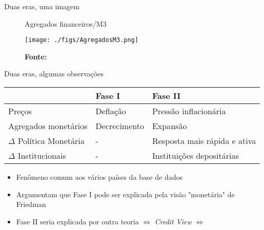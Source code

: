 \documentclass[presentation]{beamer}
\begin{document}
\begin{frame}[label={sec:org25dfaf0}]{Duas eras, uma imagem}
\begin{figure}[htb]
\centering
\caption{Agregados financeiros/M3} 
\texttt{[image: ./figs/AgregadosM3.png]}
\label{fig:agregados}
\caption*{\textbf{Fonte:} \textcite[p.~ 1035]{schularickCreditBoomsGone2012}}
\end{figure}
\end{frame}

\begin{frame}[label={sec:org19044e6}]{Duas eras, algumas observações}
\begin{center}
\begin{tabular}{lll}
\hline
 & Fase I & Fase II\\
\hline
Preços & Deflação & Pressão inflacionária\\
Agregados monetários & Decrecimento & Expansão\\
\(\Delta\) Política Monetária & - & Resposta mais rápida e ativa\\
\(\Delta\) Institucionais & - & Instituições depositárias\\
\hline
\end{tabular}
\end{center}

\begin{itemize}
\item Fenômeno comum aos vários países da base de dados
\item Argumentam que Fase I pode ser explicada pela visão "monetária" de Friedman
\item Fase II seria explicada por outra teoria \(\Leftrightarrow\) \emph{Credit View} \(\Leftrightarrow\) \textcite{minsky_1977_Financial}
\end{itemize}
\end{frame}
\end{document}
